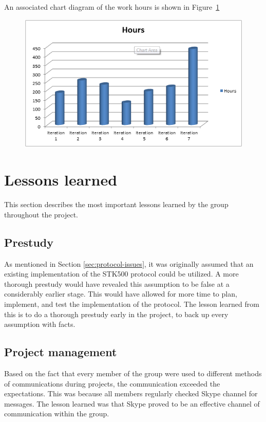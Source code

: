 	An associated chart diagram of the work hours is shown in Figure~\ref{fig:workhours}

	\begin{figure}[H]
	\centering
	\includegraphics[scale=0.8]{images/workhours_chart2.png}
	\label{fig:workhours}
	\end{figure}

	\section{Lessons learned}
	This section describes the most important lessons learned by the group throughout the project. 

	\subsection{Prestudy}
	As mentioned in Section \ref{sec:protocol-issues}, it was originally assumed that an existing implementation of the STK500 protocol could be utilized. A more thorough prestudy would have revealed this assumption to be false at a considerably earlier stage. This would have allowed for more time to plan, implement, and test the implementation of the protocol. The lesson learned from this is to do a thorough prestudy early in the project, to back up every assumption with facts.

	\subsection{Project management}
	Based on the fact that every member of the group were used to different methods of communications during projects, the communication exceeded the expectations. This was because all members regularly checked Skype channel for messages. The lesson learned was that Skype proved to be an effective channel of communication within the group.\\

